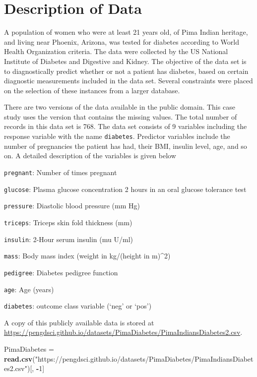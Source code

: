 \documentclass[
]{book}
\newenvironment{Shaded}{\begin{snugshade}}{\end{snugshade}}
\newcommand{\DecValTok}[1]{\textcolor[rgb]{0.00,0.00,0.81}{#1}}
\newcommand{\FunctionTok}[1]{\textcolor[rgb]{0.13,0.29,0.53}{\textbf{#1}}}
\newcommand{\NormalTok}[1]{#1}
\newcommand{\OtherTok}[1]{\textcolor[rgb]{0.56,0.35,0.01}{#1}}
\newcommand{\SpecialCharTok}[1]{\textcolor[rgb]{0.81,0.36,0.00}{\textbf{#1}}}
\newcommand{\StringTok}[1]{\textcolor[rgb]{0.31,0.60,0.02}{#1}}
\begin{document}
\hypertarget{description-of-data}{%
\section{Description of Data}\label{description-of-data}}

A population of women who were at least 21 years old, of Pima Indian heritage, and living near Phoenix, Arizona, was tested for diabetes according to World Health Organization criteria. The data were collected by the US National Institute of Diabetes and Digestive and Kidney. The objective of the data set is to diagnostically predict whether or not a patient has diabetes, based on certain diagnostic measurements included in the data set. Several constraints were placed on the selection of these instances from a larger database.

There are two versions of the data available in the public domain. This case study uses the version that contains the missing values. The total number of records in this data set is 768. The data set consists of 9 variables including the response variable with the name \texttt{diabetes}. Predictor variables include the number of pregnancies the patient has had, their BMI, insulin level, age, and so on. A detailed description of the variables is given below

\texttt{pregnant}: Number of times pregnant

\texttt{glucose}: Plasma glucose concentration 2 hours in an oral glucose tolerance test

\texttt{pressure}: Diastolic blood pressure (mm Hg)

\texttt{triceps}: Triceps skin fold thickness (mm)

\texttt{insulin}: 2-Hour serum insulin (mu U/ml)

\texttt{mass}: Body mass index (weight in kg/(height in m)\^{}2)

\texttt{pedigree}: Diabetes pedigree function

\texttt{age}: Age (years)

\texttt{diabetes}: outcome class variable (`neg' or `pos')

A copy of this publicly available data is stored at \url{https://pengdsci.github.io/datasets/PimaDiabetes/PimaIndiansDiabetes2.csv}.

\begin{Shaded}
\begin{Highlighting}[]
\NormalTok{PimaDiabetes }\OtherTok{=} \FunctionTok{read.csv}\NormalTok{(}\StringTok{"https://pengdsci.github.io/datasets/PimaDiabetes/PimaIndiansDiabetes2.csv"}\NormalTok{)[, }\SpecialCharTok{{-}}\DecValTok{1}\NormalTok{]}
\end{Highlighting}
\end{Shaded}
\end{document}

